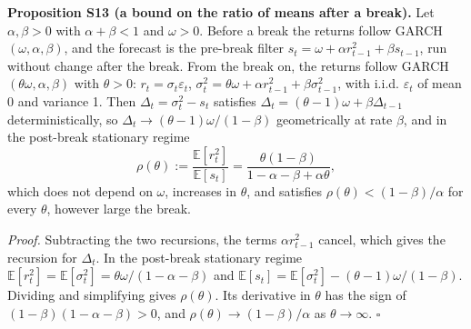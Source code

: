 \documentclass[
]{article}
\begin{document}
\textbf{Proposition S13 (a bound on the ratio of means after a break).}
Let \(\alpha, \beta > 0\) with \(\alpha + \beta < 1\) and
\(\omega > 0\). Before a break the returns follow
GARCH\((\omega, \alpha, \beta)\), and the forecast is the pre-break
filter \(s_t = \omega + \alpha r_{t-1}^2 + \beta s_{t-1}\), run without
change after the break. From the break on, the returns follow
GARCH\((\theta\omega, \alpha, \beta)\) with \(\theta > 0\):
\(r_t = \sigma_t \varepsilon_t\),
\(\sigma_t^2 = \theta\omega + \alpha r_{t-1}^2 + \beta \sigma_{t-1}^2\),
with i.i.d. \(\varepsilon_t\) of mean 0 and variance 1. Then
\(\Delta_t = \sigma_t^2 - s_t\) satisfies
\(\Delta_t = (\theta-1)\omega + \beta \Delta_{t-1}\) deterministically,
so \(\Delta_t \to (\theta-1)\omega/(1-\beta)\) geometrically at rate
\(\beta\), and in the post-break stationary regime \[
\rho(\theta) := \frac{\mathbb{E}[r_t^2]}{\mathbb{E}[s_t]} = \frac{\theta(1-\beta)}{1 - \alpha - \beta + \alpha \theta},
\] which does not depend on \(\omega\), increases in \(\theta\), and
satisfies \(\rho(\theta) < (1-\beta)/\alpha\) for every \(\theta\),
however large the break.

\emph{Proof.} Subtracting the two recursions, the terms
\(\alpha r_{t-1}^2\) cancel, which gives the recursion for \(\Delta_t\).
In the post-break stationary regime
\(\mathbb{E}[r_t^2] = \mathbb{E}[\sigma_t^2] = \theta\omega/(1 - \alpha - \beta)\)
and
\(\mathbb{E}[s_t] = \mathbb{E}[\sigma_t^2] - (\theta-1)\omega/(1-\beta)\).
Dividing and simplifying gives \(\rho(\theta)\). Its derivative in
\(\theta\) has the sign of \((1-\beta)(1-\alpha-\beta) > 0\), and
\(\rho(\theta) \to (1-\beta)/\alpha\) as \(\theta \to \infty\).
\(\square\)
\end{document}
